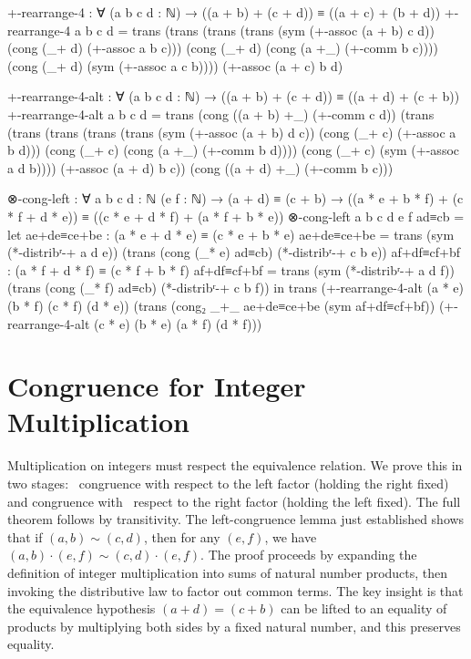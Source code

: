 \documentclass[11pt,a4paper]{book}
\begin{document}
\begin{code}
+-rearrange-4 : ∀ (a b c d : ℕ) → ((a + b) + (c + d)) ≡ ((a + c) + (b + d))
+-rearrange-4 a b c d =
  trans (trans (trans (trans (sym (+-assoc (a + b) c d))
                             (cong (_+ d) (+-assoc a b c)))
                      (cong (_+ d) (cong (a +_) (+-comm b c))))
                (cong (_+ d) (sym (+-assoc a c b))))
        (+-assoc (a + c) b d)

+-rearrange-4-alt : ∀ (a b c d : ℕ) → ((a + b) + (c + d)) ≡ ((a + d) + (c + b))
+-rearrange-4-alt a b c d =
  trans (cong ((a + b) +_) (+-comm c d))
        (trans (trans (trans (trans (trans (sym (+-assoc (a + b) d c))
                                            (cong (_+ c) (+-assoc a b d)))
                                     (cong (_+ c) (cong (a +_) (+-comm b d))))
                              (cong (_+ c) (sym (+-assoc a d b))))
                       (+-assoc (a + d) b c))
               (cong ((a + d) +_) (+-comm b c)))

⊗-cong-left : ∀ {a b c d : ℕ} (e f : ℕ)
            → (a + d) ≡ (c + b)
            → ((a * e + b * f) + (c * f + d * e)) ≡ ((c * e + d * f) + (a * f + b * e))
⊗-cong-left {a} {b} {c} {d} e f ad≡cb =
  let ae+de≡ce+be : (a * e + d * e) ≡ (c * e + b * e)
      ae+de≡ce+be = trans (sym (*-distribʳ-+ a d e)) 
                          (trans (cong (_* e) ad≡cb) 
                                 (*-distribʳ-+ c b e))
      af+df≡cf+bf : (a * f + d * f) ≡ (c * f + b * f)
      af+df≡cf+bf = trans (sym (*-distribʳ-+ a d f))
                          (trans (cong (_* f) ad≡cb)
                                 (*-distribʳ-+ c b f))
  in trans (+-rearrange-4-alt (a * e) (b * f) (c * f) (d * e))
           (trans (cong₂ _+_ ae+de≡ce+be (sym af+df≡cf+bf))
                  (+-rearrange-4-alt (c * e) (b * e) (a * f) (d * f)))
\end{code}

\section{Congruence for Integer Multiplication}

Multiplication on integers must respect the equivalence relation. We prove this in two stages: \
congruence with respect to the left factor (holding the right fixed) and congruence with \
respect to the right factor (holding the left fixed). The full theorem follows by transitivity. The left-congruence lemma just established shows that if $(a,b) \sim (c,d)$, then for any $(e,f)$, we have $(a,b) \cdot (e,f) \sim (c,d) \cdot (e,f)$. The proof proceeds by expanding the definition of integer multiplication into sums of natural number products, then invoking the distributive law to factor out common terms. The key insight is that the equivalence hypothesis $(a + d) = (c + b)$ can be lifted to an equality of products by multiplying both sides by a fixed natural number, and this preserves equality.
\end{document}
